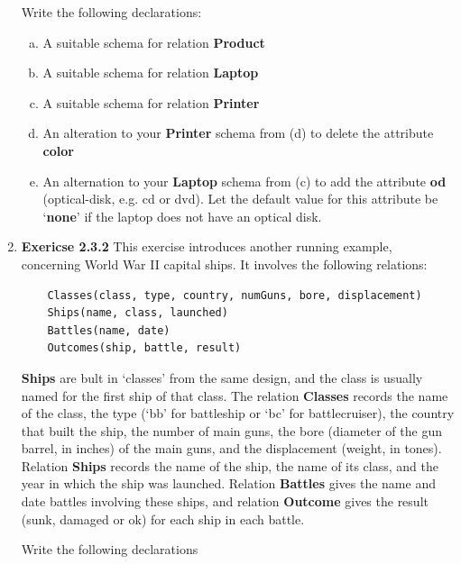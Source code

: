 \documentclass[12pt]{article}
\begin{document}
\begin{enumerate}[1.]
    \bigskip

    Write the following declarations:

    \begin{enumerate}[a)]
        \item A suitable schema for relation \textbf{Product}
        \item A suitable schema for relation \textbf{Laptop}
        \item A suitable schema for relation \textbf{Printer}
        \item An alteration to your \textbf{Printer} schema from (d) to delete
        the attribute \textbf{color}
        \item An alternation to your \textbf{Laptop} schema from (c) to add the
        attribute \textbf{od} (optical-disk, e.g. cd or dvd). Let the default value
        for this attribute be `\textbf{none}' if the laptop does not have an optical
        disk.
    \end{enumerate}

    \item \textbf{Exericse 2.3.2} This exercise introduces another running example,
    concerning World War II capital ships. It involves the following relations:

    \bigskip

    \begin{lstlisting}
    Classes(class, type, country, numGuns, bore, displacement)
    Ships(name, class, launched)
    Battles(name, date)
    Outcomes(ship, battle, result)
    \end{lstlisting}

    \textbf{Ships} are bult in `classes' from the same design, and the class is
    usually named for the first ship of that class. The relation \textbf{Classes}
    records the name of the class, the type (`bb' for battleship or `bc' for battlecruiser),
    the country that built the ship, the number of main guns, the bore (diameter of
    the gun barrel, in inches) of the main guns, and the displacement (weight, in tones).
    Relation \textbf{Ships} records the name of the ship, the name of its class,
    and the year in which the ship was launched. Relation \textbf{Battles} gives
    the name and date battles involving these ships, and relation \textbf{Outcome}
    gives the result (sunk, damaged or ok) for each ship in each battle.

    \bigskip

    Write the following  declarations


\end{enumerate}
\end{document}
